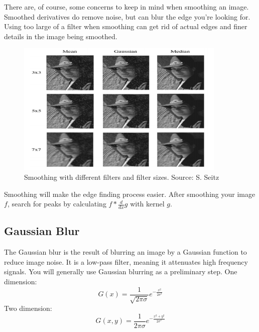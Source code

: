 \documentclass{article}
\begin{document}
There are, of course, some concerns to keep in mind when smoothing an image. Smoothed derivatives do remove noise, but can blur the edge you're looking for. Using too large of a filter when smoothing can get rid of actual edges and finer details in the image being smoothed.

\begin{figure}[H]
\centering
\includegraphics[width=10cm]{seitz_smoothing.png}
\caption{Smoothing with different filters and filter sizes. Source: S. Seitz}
\end{figure}


Smoothing will make the edge finding process easier. After smoothing your image $f$, search for peaks by calculating $f * \frac{d}{dx}g$ with kernel $g$.

\subsection{Gaussian Blur}

The Gaussian blur is the result of blurring an image by a Gaussian function to reduce image noise. It is a low-pass filter, meaning it attenuates high frequency signals. You will generally use Gaussian blurring as a preliminary step.
\newline
One dimension:
$$G(x) = \frac{1}{\sqrt{2\pi\sigma}}e^{-\frac{x^2}{2\sigma^2}}$$
Two dimension:
$$G(x,y) = \frac{1}{2\pi\sigma}e^{-\frac{x^2+y^2}{2\sigma^2}}$$
\end{document}
